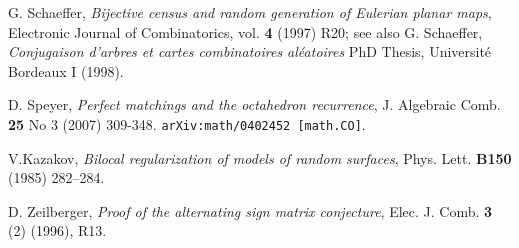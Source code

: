 \documentclass[12pt]{amsart}
\numberwithin{equation}{section}
\begin{document}
\begin{thebibliography}{10}
 G. Schaeffer, {\em Bijective census and random 
generation of Eulerian planar maps}, Electronic
Journal of Combinatorics, vol. {\bf 4} (1997) R20; see also
G. Schaeffer, {\em Conjugaison d'arbres
et cartes combinatoires al\'eatoires} PhD Thesis, Universit\'e 
Bordeaux I (1998).

 D. Speyer, \emph{Perfect matchings and the
octahedron recurrence}, J. Algebraic Comb. \textbf{25} No 3
(2007) 309-348. {\tt arXiv:math/0402452 [math.CO]}.

V.Kazakov, {\em Bilocal regularization of models of random surfaces}, 
Phys. Lett. {\bf B150} (1985) 282--284.

D. Zeilberger, {\em Proof of the alternating sign matrix conjecture}, Elec. J. Comb. {\bf 3} (2) (1996),
R13.
     
\end{thebibliography}
\end{document}
